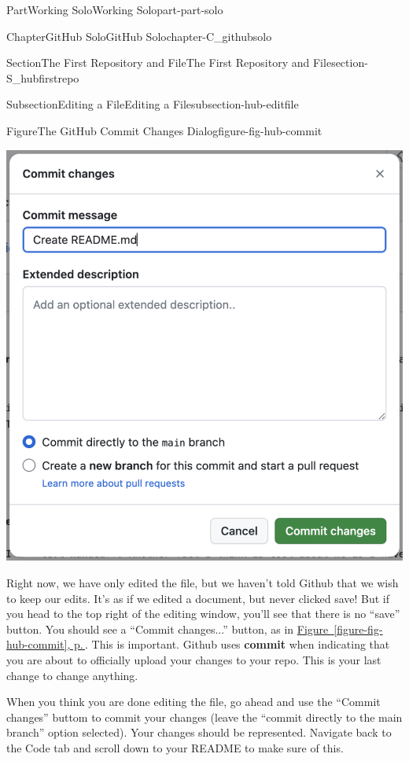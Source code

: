 \documentclass[twoside,10pt,]{book}
\newcommand{\xreffont}{\relax}
\newcommand{\terminology}[1]{\textbf{#1}}
\begin{document}
\begin{partptx}{Part}{Working Solo}{}{Working Solo}{}{}{part-part-solo}
\begin{chapterptx}{Chapter}{GitHub Solo}{}{GitHub Solo}{}{}{chapter-C_githubsolo}
\begin{sectionptx}{Section}{The First Repository and File}{}{The First Repository and File}{}{}{section-S_hubfirstrepo}
\begin{subsectionptx}{Subsection}{Editing a File}{}{Editing a File}{}{}{subsection-hub-editfile}
\begin{figureptx}{Figure}{The GitHub Commit Changes Dialog}{figure-fig-hub-commit}{}
\begin{image}{0.15}{0.7}{0.15}{}
\includegraphics[width=\linewidth]{external/hub_commit.pdf}
\end{image}%
\tcblower
\end{figureptx}%
 Right now, we have only edited the file, but we haven't told Github that we wish to keep our edits. It's as if we edited a document, but never clicked save! But if you head to the top right of the editing window, you'll see that there is no ``save'' button. You should see a ``Commit changes...'' button, as in \hyperref[figure-fig-hub-commit]{Figure~{\xreffont\ref{figure-fig-hub-commit}}, p.\,\pageref{figure-fig-hub-commit}}. This is important. Github uses \terminology{commit} when indicating that you are about to officially upload your changes to your repo. This is your last change to change anything.%
\par
When you think you are done editing the file, go ahead and use the ``Commit changes'' buttom to commit your changes (leave the ``commit directly to the main branch'' option selected). Your changes should be represented. Navigate back to the Code tab and scroll down to your README to make sure of this.%
\par

\end{subsectionptx}
\end{sectionptx}
\end{chapterptx}
\end{partptx}
\end{document}
